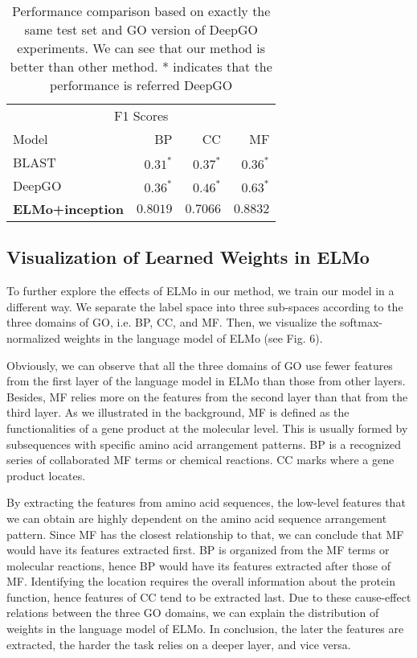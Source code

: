 \documentclass{article}
\begin{document}
    \begin{table}
    	\centering
    
        \begin{tabular}{lrrr}
            \hline
            \multicolumn{4}{c}{F1 Scores} \\
            \cline{2-4}
            Model     & BP & CC & MF \\
            \hline
            BLAST   & $0.31^{*}$ & $0.37^{*}$ & $0.36^{*}$     \\ \hline
            DeepGO  & $0.36^{*}$ & $0.46^{*}$ & $0.63^{*}$      \\ \hline 
            \textbf{ELMo+inception}  & $\mathbf{0.8019}$ &  $\mathbf{0.7066}$ & $\mathbf{0.8832}$ \\ \hline
        \end{tabular}
        
      	\caption{Performance comparison based on exactly the same test set and GO version of DeepGO experiments. We can see that our method is better than other method. * indicates that the performance is referred DeepGO}
    \end{table}

        \subsection{Visualization of Learned Weights in ELMo}
            To further explore the effects of ELMo in our method, we train our model in a different way. We separate the label space into three sub-spaces according to the three domains of GO, i.e. BP, CC, and MF. Then, we visualize the softmax-normalized weights in the language model of ELMo (see Fig. 6). \par 
            
            Obviously, we can observe that all the three domains of GO use fewer features from the first layer of the language model in ELMo than those from other layers. Besides, MF relies more on the features from the second layer than that from the third layer. As we illustrated in the background, MF is defined as the functionalities of a gene product at the molecular level. This is usually formed by subsequences with specific amino acid arrangement patterns. BP is a recognized series of collaborated MF terms or chemical reactions. CC marks where a gene product locates.  \par
            
            By extracting the features from amino acid sequences, the low-level features that we can obtain are highly dependent on the amino acid sequence arrangement pattern. Since MF has the closest relationship to that, we can conclude that MF would have its features extracted first. BP is organized from the MF terms or molecular reactions, hence BP would have its features extracted after those of MF. Identifying the location requires the overall information about the protein function, hence features of CC tend to be extracted last. Due to these cause-effect relations between the three GO domains, we can explain the distribution of weights in the language model of ELMo. In conclusion, the later the features are extracted, the harder the task relies on a deeper layer, and vice versa.
            
\end{document}
